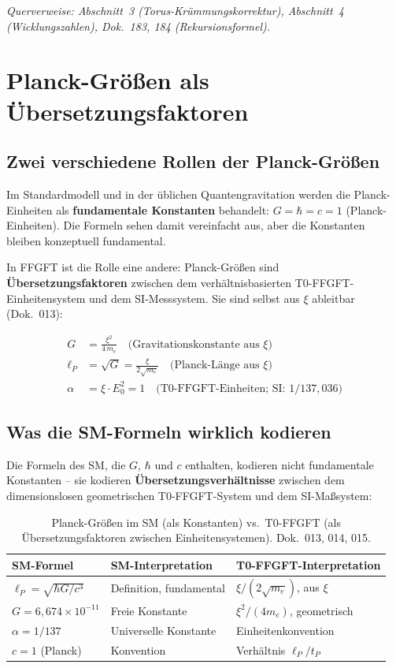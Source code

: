 \noindent\textit{Querverweise: Abschnitt~3 (Torus-Krümmungskorrektur),
Abschnitt~4 (Wicklungszahlen), Dok.~183, 184 (Rekursionsformel).}

\section{Planck-Größen als Übersetzungsfaktoren}

\subsection{Zwei verschiedene Rollen der Planck-Größen}

Im Standardmodell und in der üblichen Quantengravitation werden
die Planck-Einheiten als \textbf{fundamentale Konstanten} behandelt:
$G = \hbar = c = 1$ (Planck-Einheiten). Die Formeln sehen damit
vereinfacht aus, aber die Konstanten bleiben konzeptuell fundamental.

In FFGFT ist die Rolle eine andere: Planck-Größen sind
\textbf{Übersetzungsfaktoren} zwischen dem verhältnisbasierten
T0-FFGFT-Einheitensystem und dem SI-Messsystem. Sie sind selbst aus
$\xi$ ableitbar (Dok.~013):

\begin{align}
    G &= \frac{\xi^2}{4\,m_e}
    \quad \text{(Gravitationskonstante aus } \xi\text{)} \\[4pt]
    \ell_P &= \sqrt{G} = \frac{\xi}{2\sqrt{m_e}}
    \quad \text{(Planck-Länge aus } \xi\text{)} \\[4pt]
    \alpha &= \xi \cdot E_0^2 = 1
    \quad \text{(T0-FFGFT-Einheiten; SI: } 1/137{,}036\text{)}
\end{align}

\subsection{Was die SM-Formeln wirklich kodieren}

Die Formeln des SM, die $G$, $\hbar$ und $c$ enthalten, kodieren
nicht fundamentale Konstanten -- sie kodieren
\textbf{Übersetzungsverhältnisse} zwischen dem dimensionslosen
geometrischen T0-FFGFT-System und dem SI-Maßsystem:

\begin{table}[htbp]
\centering\small
\begin{tabular}{lll}
\toprule
\textbf{SM-Formel} & \textbf{SM-Interpretation} & \textbf{T0-FFGFT-Interpretation} \\
\midrule
$\ell_P = \sqrt{\hbar G/c^3}$ & Definition, fundamental & $\xi/(2\sqrt{m_e})$, aus $\xi$ \\
$G = 6{,}674 \times 10^{-11}$ & Freie Konstante          & $\xi^2/(4m_e)$, geometrisch \\
$\alpha = 1/137$ & Universelle Konstante    & Einheitenkonvention \\
$c = 1$ (Planck) & Konvention               & Verhältnis $\ell_P/t_P$ \\
\bottomrule
\end{tabular}
\caption{Planck-Größen im SM (als Konstanten) vs.\ T0-FFGFT (als
Übersetzungsfaktoren zwischen Einheitensystemen). Dok.~013, 014, 015.}
\label{tab:planck_translation}
\end{table}

